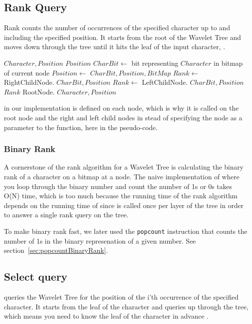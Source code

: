 \subsection{Rank Query}
Rank counts the number of occurrences of the specified character up to and including the specified position. 
It starts from the root of the Wavelet Tree and moves down through the tree until it hits the leaf of the input character, \citep{Claude08practicalrankselect}.

\begin{mdframed}[nobreak]
\begin{algorithmic} 
 {$Character, Position$}
\State \Return $Position$
\EndIf
\State $CharBit \gets$ bit representing $Character$ in bitmap of current node
\State $Position \gets$  {$CharBit, Position, BitMap$}
	\State $Rank \gets$ RightChildNode. {$CharBit, Position$}
\Else
	\State $Rank \gets$ LeftChildNode. {$CharBit, Position$}
\EndIf
\State \Return $Rank$ 
\EndFunction
\State RootNode. {$Character, Position$}
\end{algorithmic}
\end{mdframed}


\noindent {} in our implementation is defined on each node, which is why it is called on the root node and the right and left child nodes in stead of specifying the node as a parameter to the  function, here in the pseudo-code.

\subsubsection{Binary Rank} 
\label{sec:TheoryBinaryRank}
A cornerstone of the rank algorithm for a Wavelet Tree is calculating the binary rank of a character on a bitmap at a node.
The naive implementation of  where you loop through the binary number and count the number of 1s or 0s takes O(N) time, which is too much because the running time of the rank algorithm depends on the running time of  since  is called once per layer of the tree in order to answer a single rank query on the tree.

To make binary rank fast, we later used the \texttt{popcount} instruction that counts the number of 1s in the binary represenation of a given number. See section~\ref{sec:popcountBinaryRank}.

\subsection{Select query}
 queries the Wavelet Tree for the position of the i'th occurrence of the specified character.
It starts from the leaf of the character and queries up through the tree, which means you need to know the leaf of the character in advance \citep{Claude08practicalrankselect}. 



